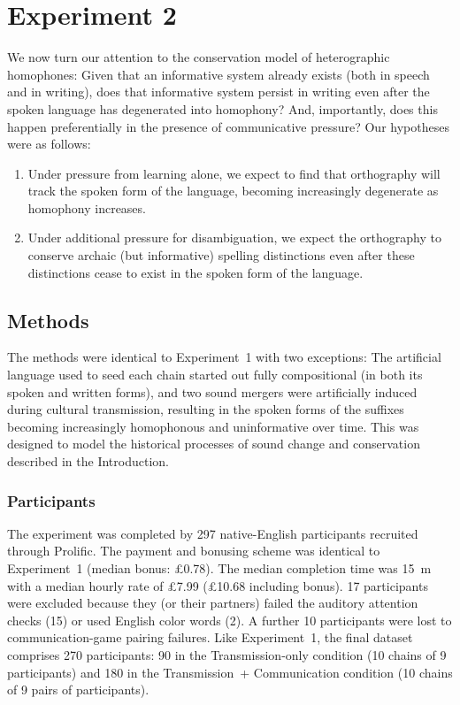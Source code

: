 \documentclass[doc,biblatex]{apa7}
\begin{document}

\section{Experiment 2}

We now turn our attention to the conservation model of heterographic homophones: Given that an informative system already exists (both in speech and in writing), does that informative system persist in writing even after the spoken language has degenerated into homophony? And, importantly, does this happen preferentially in the presence of communicative pressure? Our hypotheses were as follows:
\begin{enumerate}
	\item Under pressure from learning alone, we expect to find that orthography will track the spoken form of the language, becoming increasingly degenerate as homophony increases.
	\item Under additional pressure for disambiguation, we expect the orthography to conserve archaic (but informative) spelling distinctions even after these distinctions cease to exist in the spoken form of the language.
\end{enumerate}

\subsection{Methods}

The methods were identical to Experiment~1 with two exceptions: The artificial language used to seed each chain started out fully compositional (in both its spoken and written forms), and two sound mergers were artificially induced during cultural transmission, resulting in the spoken forms of the suffixes becoming increasingly homophonous and uninformative over time. This was designed to model the historical processes of sound change and conservation described in the Introduction.

\subsubsection{Participants}

The experiment was completed by 297 native-English participants recruited through Prolific. The payment and bonusing scheme was identical to Experiment~1 (median bonus: £0.78). The median completion time was 15~m with a median hourly rate of £7.99 (£10.68 including bonus). 17 participants were excluded because they (or their partners) failed the auditory attention checks (15) or used English color words (2). A further 10 participants were lost to communication-game pairing failures. Like Experiment~1, the final dataset comprises 270 participants: 90 in the Transmission-only condition (10 chains of 9 participants) and 180 in the Transmission~+ Communication condition (10 chains of 9 pairs of participants).
\end{document}
